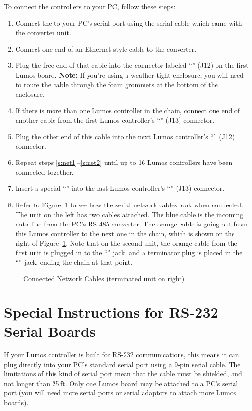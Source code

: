 \documentclass[letterpaper,twoside,onecolumn,openright,final]{memoir}
\begin{document}
To connect the controllers to your PC, follow these steps:
\begin{enumerate}
	\item	Connect the  to your PC's serial port using the serial cable
		which came with the converter unit.
	\item	Connect one end of an Ethernet-style cable to the  converter.
	\item	Plug the free end of that cable into the connector labeled ``'' (J12) on the first Lumos
		board.  {\bfseries Note:} If you're using a weather-tight enclosure, you will need to route the cable through
		the foam grommets at the bottom of the enclosure.
	\item\label{s:net1}
		If there is more than one Lumos controller in the chain, connect one end of another 
		cable
		from the first Lumos controller's ``'' (J13) connector.
	\item\label{s:net2}
		Plug the other end of this cable into the next Lumos controller's ``'' (J12) connector.
	\item	Repeat steps \ref{s:net1}--\ref{s:net2} until up to 16 Lumos controllers have been connected together.
	\item	Insert a special ``'' into the last Lumos controller's ``'' (J13) connector.
	\item	Refer to Figure~\ref{fig:netcables} to see how the serial network cables look
		when connected.  The unit on the left has two cables attached.  The blue cable is the incoming data line
		from the PC's RS-485 converter.  The orange cable is going out from this Lumos controller to the next one in the
		chain, which is shown on the right of Figure~\ref{fig:netcables}.  Note that on the second unit, the orange cable
		from the first unit is plugged in to the ``'' jack, and a terminator plug is placed in the ``'' jack,
		ending the chain at that point.
\end{enumerate}

\begin{figure}
	\centerline{ }
	\caption{Connected Network Cables (terminated unit on right)\label{fig:netcables}}
\end{figure}

\section{Special Instructions for RS-232 Serial Boards}\label{sec:rs232}
If your Lumos controller is built for RS-232 communications, this means it can plug directly into
your PC's standard serial port using a 9-pin serial cable.  The limitations of this kind of serial port
mean that the cable must be shielded, and not longer than 25\,ft.  Only one Lumos board may be attached
to a PC's serial port (you will need more serial ports or  serial adaptors to attach more Lumos
boards).
\end{document}

